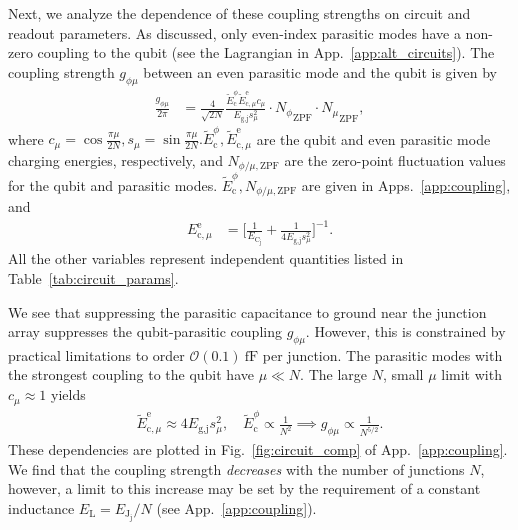 \documentclass[%
reprint,
superscriptaddress,
 amsmath,amssymb,
 aps,
 prx,
longbibliography,
floatfix,
]{revtex4-2}
\newcommand{\singh}[1]{{\color{orange}{{}#1}}}%
\newcommand{\AC}[1]{{\color{blue}{{}[AC: #1]}}}
\begin{document}
Next, we analyze the dependence of these coupling strengths on circuit and readout parameters. As discussed, only even-index parasitic modes have a non-zero coupling to the qubit (see the Lagrangian in App.~\ref{app:alt_circuits}). The coupling strength $g_{\phi \mu}$ between an even parasitic mode and the qubit is given by
\begin{align}
\frac{g_{\phi\mu}}{2\pi}&=\frac{4}{\sqrt{2N}} \frac{\tilde{E}^\phi_\textrm{c}\tilde{E}^\textrm{e}_{\textrm{c},\mu}c_\mu}{E_{\textrm{g,j}}s_\mu^2}     \cdot {N_\phi}_{\mathrm{ZPF}} \cdot {N_\mu}_{\mathrm{ZPF}},
\end{align}
where $c_\mu=\cos{\frac{\pi\mu}{2N}},s_\mu = \sin \frac{\pi \mu}{2N}.\tilde{E}_\textrm{c}^\phi,\tilde{E}^\textrm{e}_{\textrm{c},\mu} $ are the qubit and even parasitic mode charging energies, respectively, and $N_{\phi/\mu,\mathrm{ZPF}}$ are the zero-point fluctuation values for the qubit and parasitic modes. $\tilde{E}_\textrm{c}^\phi,N_{\phi/\mu,\mathrm{ZPF}}$ are given in Apps.~\ref{app:coupling}, and
\begin{align}
E_{\textrm{c},\mu}^\textrm{e}&=\Big[\frac{1}{E_{\textrm{C}_\textrm{j}}}+\frac{1}{4E_{\textrm{g,j}}s_\mu^2}\Big]^{-1}.\label{eq:parasitic}
\end{align}
All the other variables represent independent quantities listed in Table~\ref{tab:circuit_params}. 

We see that  suppressing the parasitic capacitance to ground near the junction array suppresses the qubit-parasitic coupling $g_{\phi\mu}$. However, this is constrained by practical limitations to order $\mathcal{O}(0.1) \ \mathrm{fF}$  per junction. The parasitic modes with the strongest coupling to the qubit have $\mu\ll N$. The large $N$, small $\mu$ limit with $c_\mu\approx 1$ yields
\begin{align}
    \tilde{E}^\textrm{e}_{\textrm{c},\mu}\approx 4E_{\textrm{g,j}}s_\mu^2, \quad \tilde{E}^\phi_\textrm{c}\propto \frac{1}{N^2}\implies g_{\phi\mu}\propto \frac{1}{N^{5/2}}.\label{eq:dep1}
\end{align}
These dependencies are plotted in Fig.~\ref{fig:circuit_comp} of App.~\ref{app:coupling}. We find that the coupling strength \textit{decreases} with the number of junctions $N$, however, a limit to this increase may be set by the requirement of a constant inductance $E_\textrm{L}=E_{\textrm{J}_\textrm{j}}/N$ (see App.~\ref{app:coupling}). 
\end{document}
